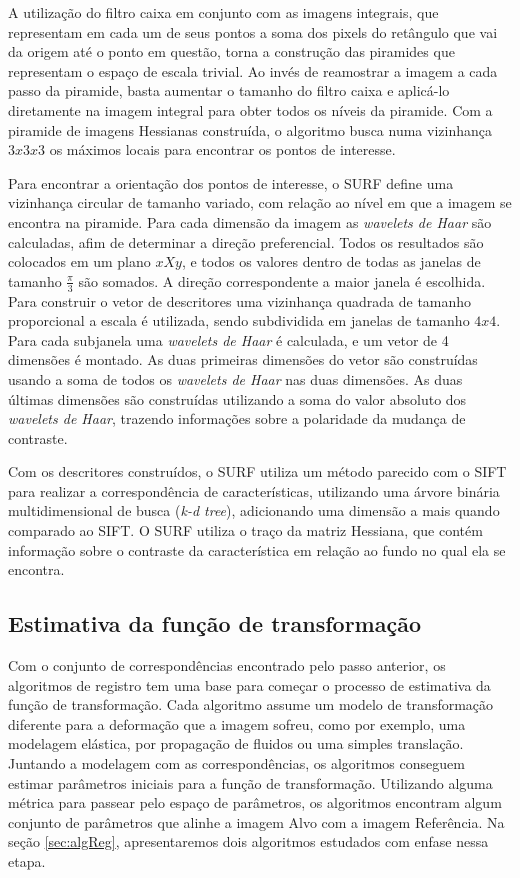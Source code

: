   A utilização do filtro caixa em conjunto com as imagens integrais, que representam em cada um de seus pontos a soma
dos pixels do retângulo que vai da origem até o ponto em questão, torna a construção das piramides que representam o
espaço de escala trivial. Ao invés de reamostrar a imagem a cada passo da piramide, basta aumentar o tamanho do filtro
caixa e aplicá-lo diretamente na imagem integral para obter todos os níveis da piramide. Com a piramide de imagens
Hessianas construída, o algoritmo busca numa vizinhança $3x3x3$ os máximos locais para encontrar os pontos de interesse.

  Para encontrar a orientação dos pontos de interesse, o SURF define uma vizinhança circular de tamanho variado, com
relação ao nível em que a imagem se encontra na piramide. Para cada dimensão da imagem as \textit{wavelets de Haar} são
calculadas, afim de determinar a direção preferencial. Todos os resultados são colocados em um plano $xXy$, e todos os 
valores dentro de todas as janelas de tamanho $\frac{\pi}{3}$ são somados. A direção correspondente a maior janela é 
escolhida. Para construir o vetor de descritores uma vizinhança quadrada de tamanho proporcional a escala é utilizada,
sendo subdividida em janelas de tamanho $4x4$. Para cada subjanela uma \textit{wavelets de Haar} é calculada, e um vetor
de 4 dimensões é montado. As duas primeiras dimensões do vetor são construídas usando a soma de todos os 
\textit{wavelets de Haar} nas duas dimensões. As duas últimas dimensões são construídas utilizando a soma do valor 
absoluto dos \textit{wavelets de Haar}, trazendo informações sobre a polaridade da mudança de contraste.

  Com os descritores construídos, o SURF utiliza um método parecido com o SIFT para realizar a correspondência de 
características, utilizando uma árvore binária multidimensional de busca (\textit{k-d tree}), adicionando uma dimensão a 
mais quando comparado ao SIFT. O SURF utiliza o traço da matriz Hessiana, que contém informação sobre o contraste da 
característica em relação ao fundo no qual ela se encontra.

\subsection{Estimativa da função de transformação}
    
Com o conjunto de correspondências encontrado pelo passo anterior, os algoritmos de registro tem uma base para 
começar o processo de estimativa da função de transformação. Cada algoritmo assume um modelo de transformação diferente
para a deformação que a imagem sofreu, como por exemplo, uma modelagem elástica, por propagação de fluidos ou uma
simples translação. Juntando a modelagem com as correspondências, os algoritmos conseguem estimar parâmetros iniciais
para a função de transformação. Utilizando alguma métrica para passear pelo espaço de parâmetros, os algoritmos encontram
algum conjunto de parâmetros que alinhe a imagem Alvo com a imagem Referência. Na seção \ref{sec:algReg}, apresentaremos
dois algoritmos estudados com enfase nessa etapa.

